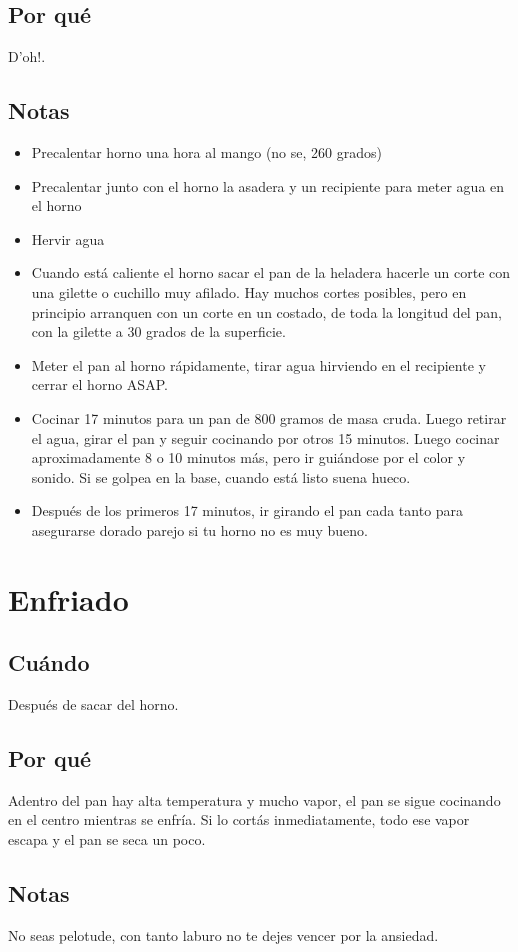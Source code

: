 \documentclass[10pt,a4paper]{article}
\begin{document}
\subsection*{Por qué}
D'oh!.
\subsection*{Notas}
  \begin{itemize}
    \item Precalentar horno una hora al mango (no se, 260 grados)
    \item Precalentar junto con el horno la asadera y un recipiente para meter
      agua en el horno
    \item Hervir agua
    \item Cuando está caliente el horno sacar el pan de la heladera hacerle un
      corte con una gilette o cuchillo muy afilado. Hay muchos cortes posibles,
      pero en principio arranquen con un corte en un costado, de toda la
      longitud del pan, con la gilette a 30 grados de la superficie.

    \item Meter el pan al horno rápidamente, tirar agua hirviendo en el
      recipiente y cerrar el horno ASAP.
    \item Cocinar 17 minutos para un pan de 800 gramos de masa cruda. Luego
      retirar el agua, girar el pan y seguir cocinando por otros 15 minutos.
      Luego cocinar aproximadamente 8 o 10 minutos más, pero ir guiándose por el
      color y sonido. Si se golpea en la base, cuando está listo suena hueco.
    \item Después de los primeros 17 minutos, ir girando el pan cada tanto para
      asegurarse dorado parejo si tu horno no es muy bueno.
  \end{itemize}

\section{Enfriado}
\subsection*{Cuándo}
Después de sacar del horno.
\subsection*{Por qué}
Adentro del pan hay alta temperatura y mucho vapor, el pan se sigue cocinando en
el centro mientras se enfría. Si lo cortás inmediatamente, todo ese vapor escapa
y el pan se seca un poco.
\subsection*{Notas}
No seas pelotude, con tanto laburo no te dejes vencer por la ansiedad.
\end{document}
